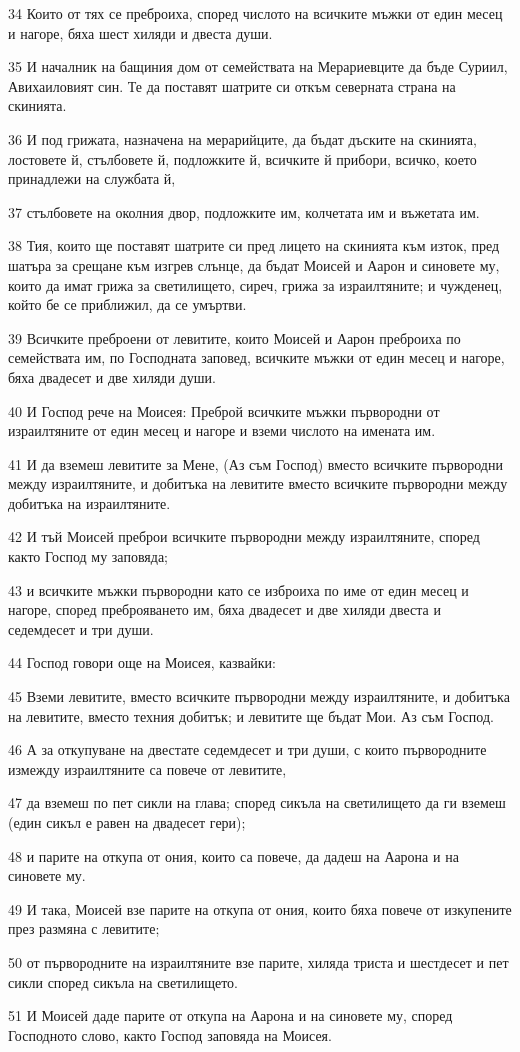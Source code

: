 \par 34 Които от тях се преброиха, според числото на всичките мъжки от един месец и нагоре, бяха шест хиляди и двеста души.
\par 35 И началник на бащиния дом от семействата на Мерариевците да бъде Суриил, Авихаиловият син. Те да поставят шатрите си откъм северната страна на скинията.
\par 36 И под грижата, назначена на мерарийците, да бъдат дъските на скинията, лостовете й, стълбовете й, подложките й, всичките й прибори, всичко, което принадлежи на службата й,
\par 37 стълбовете на околния двор, подложките им, колчетата им и въжетата им.
\par 38 Тия, които ще поставят шатрите си пред лицето на скинията към изток, пред шатъра за срещане към изгрев слънце, да бъдат Моисей и Аарон и синовете му, които да имат грижа за светилището, сиреч, грижа за израилтяните; и чужденец, който бе се приближил, да се умъртви.
\par 39 Всичките преброени от левитите, които Моисей и Аарон преброиха по семействата им, по Господната заповед, всичките мъжки от един месец и нагоре, бяха двадесет и две хиляди души.
\par 40 И Господ рече на Моисея: Преброй всичките мъжки първородни от израилтяните от един месец и нагоре и вземи числото на имената им.
\par 41 И да вземеш левитите за Мене, (Аз съм Господ) вместо всичките първородни между израилтяните, и добитъка на левитите вместо всичките първородни между добитъка на израилтяните.
\par 42 И тъй Моисей преброи всичките първородни между израилтяните, според както Господ му заповяда;
\par 43 и всичките мъжки първородни като се изброиха по име от един месец и нагоре, според преброяването им, бяха двадесет и две хиляди двеста и седемдесет и три души.
\par 44 Господ говори още на Моисея, казвайки:
\par 45 Вземи левитите, вместо всичките първородни между израилтяните, и добитъка на левитите, вместо техния добитък; и левитите ще бъдат Мои. Аз съм Господ.
\par 46 А за откупуване на двестате седемдесет и три души, с които първородните измежду израилтяните са повече от левитите,
\par 47 да вземеш по пет сикли на глава; според сикъла на светилището да ги вземеш (един сикъл е равен на двадесет гери);
\par 48 и парите на откупа от ония, които са повече, да дадеш на Аарона и на синовете му.
\par 49 И така, Моисей взе парите на откупа от ония, които бяха повече от изкупените през размяна с левитите;
\par 50 от първородните на израилтяните взе парите, хиляда триста и шестдесет и пет сикли според сикъла на светилището.
\par 51 И Моисей даде парите от откупа на Аарона и на синовете му, според Господното слово, както Господ заповяда на Моисея.

